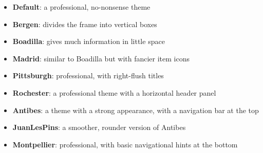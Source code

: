 \documentclass[notes=show,beamer]{beamer}
\begin{document}
\begin{frame}%

\hypertarget{nav}{}


\begin{itemize}
\item \textbf{Default}: a professional, no-nonsense theme

\item \textbf{Bergen}: divides the frame into vertical boxes

\item \textbf{Boadilla}: gives much information in little space

\item \textbf{Madrid}: similar to Boadilla but with fancier item icons

\item \textbf{Pittsburgh}: professional, with right-flush titles

\item \textbf{Rochester}: a professional theme with a horizontal header panel
\end{itemize}

\transboxout%
\end{frame}%

\begin{frame}%

\hypertarget{tree}{}


\begin{itemize}
\item \textbf{Antibes}: a theme with a strong appearance, with a navigation
bar at the top

\item \textbf{JuanLesPins}: a smoother, rounder version of Antibes

\item \textbf{Montpellier}: professional, with basic navigational hints at
the bottom
\end{itemize}

\transboxout%
\end{frame}%
\end{document}
